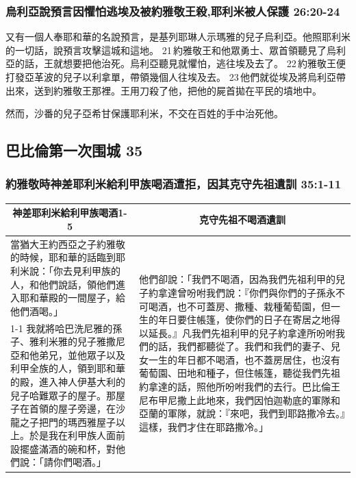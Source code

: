 \subsubsection{烏利亞說預言因懼怕逃埃及被約雅敬王殺,耶利米被人保護 26:20-24}
又有一個人奉耶和華的名說預言，是基列耶琳人示瑪雅的兒子烏利亞。他照耶利米的一切話，說預言攻擊這城和這地。 21 約雅敬王和他眾勇士、眾首領聽見了烏利亞的話，王就想要把他治死。烏利亞聽見就懼怕，逃往埃及去了。 22 約雅敬王便打發亞革波的兒子以利拿單，帶領幾個人往埃及去。 23 他們就從埃及將烏利亞帶出來，送到約雅敬王那裡。王用刀殺了他，把他的屍首拋在平民的墳地中。

然而，沙番的兒子亞希甘保護耶利米，不交在百姓的手中治死他。


\subsection{巴比倫第一次围城 35}
\subsubsection{約雅敬時神差耶利米給利甲族喝酒遭拒，因其克守先祖遺訓 35:1-11}
\begin{table}[H]
\centering
\begin{tabular}{p{7.75cm}|p{9.50cm}}\hline\hline
\multicolumn{1}{c|}{神差耶利米給利甲族喝酒1-5}&\multicolumn{1}{c}{克守先祖不喝酒遺訓}\\\hline
當猶大王約西亞之子約雅敬的時候，耶和華的話臨到耶利米說：「你去見利甲族的人，和他們說話，領他們進入耶和華殿的一間屋子，給他們酒喝。」
&\multirow{2}{9.7cm}{他們卻說：「我們不喝酒，因為我們先祖利甲的兒子約拿達曾吩咐我們說：『你們與你們的子孫永不可喝酒，也不可蓋房、撒種、栽種葡萄園，但一生的年日要住帳篷，使你們的日子在寄居之地得以延長。』凡我們先祖利甲的兒子約拿達所吩咐我們的話，我們都聽從了。我們和我們的妻子、兒女一生的年日都不喝酒，也不蓋房居住，也沒有葡萄園、田地和種子，但住帳篷，聽從我們先祖約拿達的話，照他所吩咐我們的去行。巴比倫王尼布甲尼撒上此地來，我們因怕迦勒底的軍隊和亞蘭的軍隊，就說：『來吧，我們到耶路撒冷去。』這樣，我們才住在耶路撒冷。」}\\\cline{1-1}
我就將哈巴洗尼雅的孫子、雅利米雅的兒子雅撒尼亞和他弟兄，並他眾子以及利甲全族的人，領到耶和華的殿，進入神人伊基大利的兒子哈難眾子的屋子。那屋子在首領的屋子旁邊，在沙龍之子把門的瑪西雅屋子以上。於是我在利甲族人面前設擺盛滿酒的碗和杯，對他們說：「請你們喝酒。」&\\\hline
\end{tabular}
\end{table}

